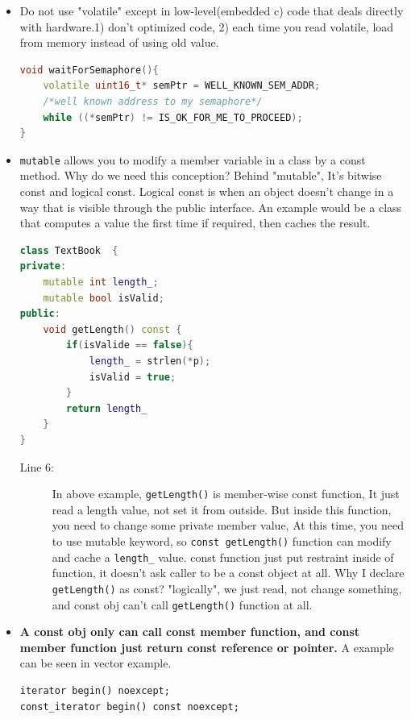 \documentclass[a4paper,11pt,twoside]{book}
\begin{document}
\begin{itemize}
\begin{enumerate}
	\end{enumerate}
	
	
	\item Do not use "volatile" except in low-level(embedded c) code that deals directly with hardware.1) don't optimized code, 2) each time you read volatile, load from memory instead of using old value.
\begin{lstlisting}[frame=single, language=c++]
void waitForSemaphore(){
	volatile uint16_t* semPtr = WELL_KNOWN_SEM_ADDR;
	/*well known address to my semaphore*/
	while ((*semPtr) != IS_OK_FOR_ME_TO_PROCEED);
}
\end{lstlisting}
	
	\item \texttt{mutable} allows you to modify a member variable in a class by a const method. Why do we need this conception? Behind "mutable", It's bitwise const and logical const. Logical const is when an object doesn't change in a way that is visible through the public interface. An example would be a class that computes a value the first time if required, then caches the result.
\begin{lstlisting}[frame=single, language=c++]
class TextBook  {
private:
	mutable int length_;
	mutable bool isValid;
public:
	void getLength() const {
		if(isValide == false){
			length_ = strlen(*p);
			isValid = true; 
		}
		return length_
	}
}
\end{lstlisting}
	\begin{description}
		\item[Line 6:] In above example, \texttt{getLength()} is member-wise const function, It just read a length value, not set it from outside. But inside this function, you need to change some private member value, At this time, you need to use mutable keyword, so \texttt{const getLength()} function can modify and cache a \texttt{length\_} value.  const function just put restraint inside of function, it doesn't ask caller to be a const object at all. Why I declare \texttt{getLength()} as const? "logically", we just read, not change something, and const obj can't call \texttt{getLength()} function at all. 
	\end{description}
	
	
	\item \textbf{A const obj only can call const member function, and const member function just return const reference or pointer.} A example can be seen in vector example.  
	
\begin{lstlisting}
iterator begin() noexcept;
const_iterator begin() const noexcept;


\end{lstlisting}
\end{itemize}
\end{document}
